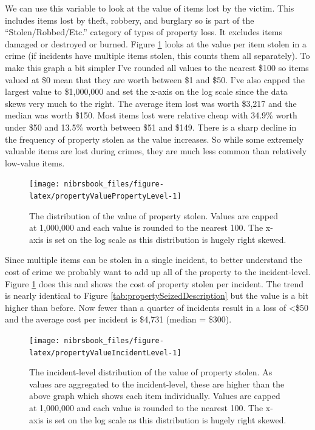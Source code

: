 \documentclass[
  12pt,
  openany]{book}
\begin{document}
We can use this variable to look at the value of items lost by the victim. This includes items lost by theft, robbery, and burglary so is part of the ``Stolen/Robbed/Etc.'' category of types of property loss. It excludes items damaged or destroyed or burned. Figure \ref{fig:propertyValuePropertyLevel} looks at the value per item stolen in a crime (if incidents have multiple items stolen, this counts them all separately). To make this graph a bit simpler I've rounded all values to the nearest \$100 so items valued at \$0 mean that they are worth between \$1 and \$50. I've also capped the largest value to \$1,000,000 and set the x-axis on the log scale since the data skews very much to the right. The average item lost was worth \$3,217 and the median was worth \$150. Most items lost were relative cheap with 34.9\% worth under \$50 and 13.5\% worth between \$51 and \$149. There is a sharp decline in the frequency of property stolen as the value increases. So while some extremely valuable items are lost during crimes, they are much less common than relatively low-value items.

\begin{figure}

{\centering \texttt{[image: nibrsbook\_files/figure-latex/propertyValuePropertyLevel-1]} 

}

\caption{The distribution of the value of property stolen. Values are capped at 1,000,000 and each value is rounded to the nearest 100. The x-axis is set on the log scale as this distribution is hugely right skewed.}\label{fig:propertyValuePropertyLevel}
\end{figure}

Since multiple items can be stolen in a single incident, to better understand the cost of crime we probably want to add up all of the property to the incident-level. Figure \ref{fig:propertyValuePropertyLevel} does this and shows the cost of property stolen per incident. The trend is nearly identical to Figure \ref{tab:propertySeizedDescription} but the value is a bit higher than before. Now fewer than a quarter of incidents result in a loss of \textless\$50 and the average cost per incident is \$4,731 (median = \$300).

\begin{figure}

{\centering \texttt{[image: nibrsbook\_files/figure-latex/propertyValueIncidentLevel-1]} 

}

\caption{The incident-level distribution of the value of property stolen. As values are aggregated to the incident-level, these are higher than the above graph which shows each item individually. Values are capped at 1,000,000 and each value is rounded to the nearest 100. The x-axis is set on the log scale as this distribution is hugely right skewed.}\label{fig:propertyValueIncidentLevel}
\end{figure}
\end{document}
